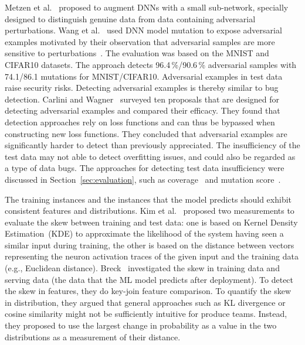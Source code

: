 Metzen et al.~ proposed to augment
DNNs with a small sub-network, specially designed to distinguish genuine data from data containing adversarial perturbations.
Wang et al.~ used DNN model mutation to expose adversarial examples motivated by their observation that adversarial samples are more sensitive to perturbations~.
The evaluation was based on the MNIST and CIFAR10 datasets.
The approach detects 96.4\,\%/90.6\,\% adversarial samples with 74.1/86.1 mutations for MNIST/CIFAR10.
Adversarial examples in test data raise security risks. Detecting adversarial examples is thereby similar to bug detection.
Carlini and Wagner~ surveyed ten proposals that are designed for detecting adversarial examples and compared their efficacy.
They found that detection approaches rely on loss functions and can thus be bypassed when constructing new loss functions. 
They concluded that adversarial examples are significantly harder to detect than previously appreciated.
The insufficiency of the test data may not able to detect overfitting issues, and
could also be regarded as a type of data bugs.
The approaches for detecting test data insufficiency were discussed in Section~\ref{sec:evaluation}, such as coverage~ and mutation score~.

The training instances and the instances that the model predicts should exhibit consistent features and distributions.
Kim et al.~ proposed two measurements to evaluate the skew between training and test data:
one is based on Kernel Density Estimation~(KDE) to approximate the likelihood of the system having seen a similar input during
training, 
the other is based on the distance between vectors representing
the neuron activation traces of the given input and the training
data (e.g., Euclidean distance).
Breck~ investigated the skew in training data and serving data (the data that the ML model predicts after deployment).
To detect the skew in features, they do key-join feature comparison.
To quantify the skew in distribution,
they argued that general approaches such as KL divergence or cosine similarity might not be sufficiently intuitive for produce teams. 
Instead, they proposed to use the largest change in probability as a value in the two distributions as a measurement of their distance.

